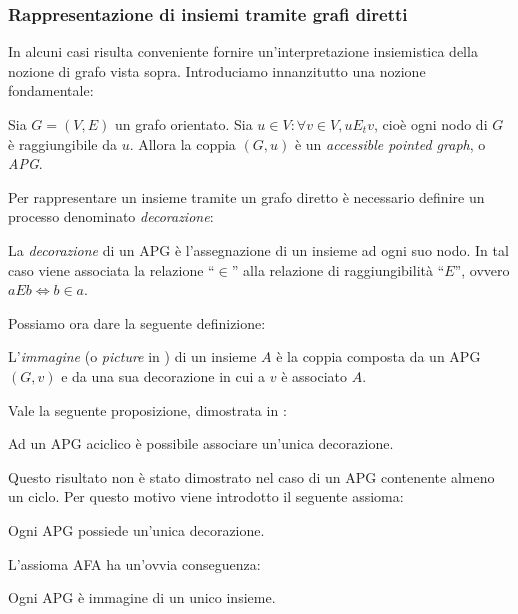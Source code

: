 
\subsubsection{Rappresentazione di insiemi tramite grafi diretti}
\label{sec:graphs_sets}
In alcuni casi risulta conveniente fornire un'in\-ter\-pre\-ta\-zio\-ne insiemistica della nozione di grafo vista sopra. Introduciamo innanzitutto una nozione fondamentale:
\begin{definition}
    Sia $G = (V, E)$ un grafo orientato. Sia $u \in V : \forall v \in V, u E_t v$, cioè ogni nodo di $G$ è raggiungibile da $u$. Allora la coppia $(G, u)$ è un \emph{accessible pointed graph}, o \emph{APG}.
\end{definition}
Per rappresentare un insieme tramite un grafo diretto è necessario definire un processo denominato \emph{decorazione}:
\begin{definition}
    La \emph{decorazione} di un APG è l'assegnazione di un insieme ad ogni suo nodo. In tal caso viene associata la relazione ``$\in$'' alla relazione di raggiungibilità ``$E$'', ovvero $aEb \iff b \in a$.
\end{definition}
Possiamo ora dare la seguente definizione:
\begin{definition}
    L'\emph{immagine} (o \emph{picture} in \cite{aczel}) di un insieme $A$ è la coppia composta da un APG $(G,v)$ e da una sua decorazione in cui a $v$ è associato $A$.
\end{definition}
Vale la seguente proposizione, dimostrata in \cite{aczel}:
\begin{proposition}
    Ad un APG aciclico è possibile associare un'unica decorazione.
\end{proposition}
Questo risultato non è stato dimostrato nel caso di un APG contenente almeno un ciclo. Per questo motivo viene introdotto il seguente assioma:
\begin{axiom}
    Ogni APG possiede un'unica decorazione.
\end{axiom}
L'assioma AFA ha un'ovvia conseguenza:
\begin{corollary}
    Ogni APG è immagine di un unico insieme.
\end{corollary}
